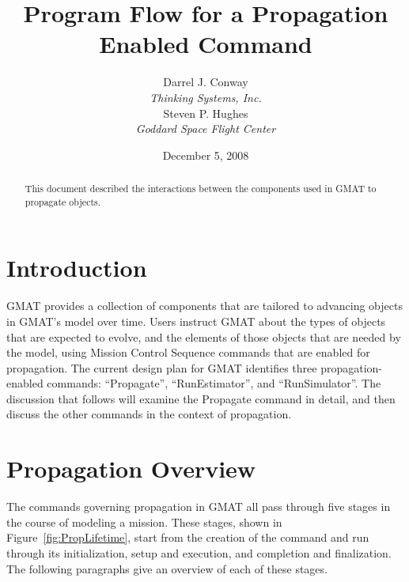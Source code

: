 \documentclass[10pt]{article}
\begin{document}
\title{Program Flow for a Propagation Enabled Command}
\author{Darrel J. Conway\\\textit{Thinking Systems, Inc.}\\
Steven P. Hughes\\\textit{Goddard Space Flight Center}}
\date{December 5, 2008}
\maketitle

\begin{abstract}
This document described the interactions between the components used in GMAT to propagate objects.
\end{abstract}

\section{Introduction}

GMAT provides a collection of components that are tailored to advancing objects in GMAT's model over time.  Users instruct GMAT about the types of objects that are expected to evolve, and the elements of those objects that are needed by the model, using Mission Control Sequence commands that are enabled for propagation.  The current design plan for GMAT identifies three propagation-enabled commands: ``Propagate'', ``RunEstimator'', and ``RunSimulator''.  The discussion that follows will examine the Propagate command in detail, and then discuss the other commands in the context of propagation.

\section{Propagation Overview}

The commands governing propagation in GMAT all pass through five stages in the course of modeling a mission.  These stages, shown in Figure~\ref{fig:PropLifetime}, start from the creation of the command and run through its initialization, setup and execution, and completion and finalization.  The following paragraphs give an overview of each of these stages.
\end{document}
